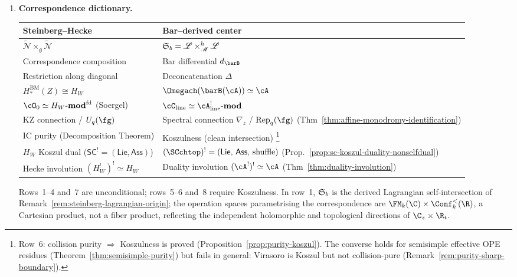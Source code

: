 \begin{theorem}
\begin{enumerate}[label=\textup{(\roman*)}]
\item \textbf{Correspondence dictionary.}
 \begin{center}
 \renewcommand{\arraystretch}{1.15}
 \begin{tabular}{@{}ll@{}}
 \toprule
 \textbf{Steinberg--Hecke} & \textbf{Bar--derived center} \\
 \midrule
 $\widetilde{\mathcal{N}} \times_{\mathfrak{g}}
 \widetilde{\mathcal{N}}$
 & $\mathfrak{S}_b = \mathscr{L} \times_{\mathscr{M}}^h
 \mathscr{L}$ \\
 Correspondence composition
 & Bar differential $d_{\barB}$ \\
 Restriction along diagonal
 & Deconcatenation $\Delta$ \\
 $H_\ast^{\mathrm{BM}}(Z) \cong H_W$
 & $\Omegach(\barB(\cA)) \simeq \cA$ \\
 $\cO_0 \simeq H_W\text{-}\mathbf{mod}^{\mathrm{fd}}$ (Soergel)
 & $\cC_{\mathrm{line}} \simeq \cA^!_{\mathrm{line}}\text{-}\mathbf{mod}$ \\
 KZ connection / $U_q(\fg)$
 & Spectral connection $\nabla_z$ / $\mathrm{Rep}_q(\fg)$
 (Thm~\ref{thm:affine-monodromy-identification}) \\
 IC purity (Decomposition Theorem)
 & Koszulness (clean intersection)%
 \footnote{Row~6: collision purity $\Rightarrow$ Koszulness
 is proved (Proposition~\ref{prop:purity-koszul}). The
 converse holds for semisimple effective OPE residues
 (Theorem~\ref{thm:semisimple-purity}) but fails in general:
 Virasoro is Koszul but not collision-pure
 (Remark~\ref{rem:purity-sharp-boundary}).} \\
 $H_W$ Koszul dual ($\mathsf{SC}^! = (\mathsf{Lie}, \mathsf{Ass})$)
 & $(\SCchtop)^! = (\mathsf{Lie},\, \mathsf{Ass},\, \text{shuffle})$
 (Prop.~\ref{prop:sc-koszul-duality-nonselfdual}) \\
 Hecke involution $(H_W^!)^! \simeq H_W$
 & Duality involution $(\cA^!)^! \simeq \cA$
 (Thm~\ref{thm:duality-involution}) \\
 \bottomrule
 \end{tabular}
 \end{center}
 \noindent Rows~1--4 and~7 are unconditional;
 rows~5--6 and~8 require Koszulness.
 In row~1, $\mathfrak{S}_b$ is the derived Lagrangian
 self-intersection of
 Remark~\textup{\ref{rem:steinberg-lagrangian-origin}};
 the operation spaces parametrising the correspondence
 are $\FM_k(\C) \times \Conf_k^{<}(\R)$, a Cartesian
 product, not a fiber product, reflecting the independent
 holomorphic and topological directions of $\C_z \times \R_t$.
\end{enumerate}
\end{theorem}

